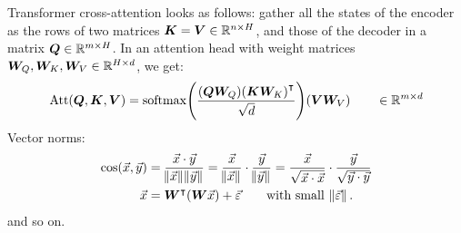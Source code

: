 Transformer cross-attention looks as follows: gather all the states of the encoder as the rows of two matrices $\bm{K} = \bm{V} \in \mathbb{R}^{n\times H}$, and those of the decoder in a matrix $\bm{Q}\in \mathbb{R}^{m\times H}$. In an attention head with weight matrices $\bm{W}_Q, \bm{W}_K, \bm{W}_V \in \mathbb{R}^{H\times d}$, we get:
\begin{equation}
	\text{Att}(\matr Q, \matr K, \matr V) = \softmax\left( \frac{(\matr Q\matr W_Q){(\matr K\matr W_K)}^\intercal}{\sqrt d} \right)(\matr V\matr W_V) \qquad \in \R^{m\times d}
\end{equation}
Vector norms:
\begin{align}
	\cos(\vec x, \vec y) &= \frac{\vec x \cdot \vec y}{\norm{\vec x} \norm{\vec y}} = \frac{\vec x}{\norm{\vec x}} \cdot \frac{\vec y}{ \norm{\vec y}} = \frac{\vec x}{\sqrt{\vec x\cdot \vec x}} \cdot \frac{\vec y}{ \sqrt{\vec y \cdot \vec y}} \\
	\vec x &= \bm{W}^\intercal(\bm{W}\vec x) + \vec \varepsilon \qquad\text{with small } \norm{\vec \varepsilon}.
\end{align}
and so on.

